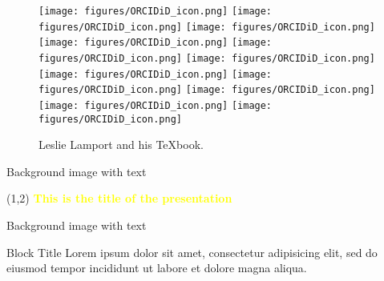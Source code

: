 \documentclass{beamer}
\begin{document}
\begin{frame}
\begin{figure}[!htpb]
\label{fig:leslie}
\texttt{[image: figures/ORCIDiD\_icon.png]}
\texttt{[image: figures/ORCIDiD\_icon.png]}
\texttt{[image: figures/ORCIDiD\_icon.png]}
\texttt{[image: figures/ORCIDiD\_icon.png]}
\texttt{[image: figures/ORCIDiD\_icon.png]}
\texttt{[image: figures/ORCIDiD\_icon.png]}
\texttt{[image: figures/ORCIDiD\_icon.png]}
\texttt{[image: figures/ORCIDiD\_icon.png]}
\texttt{[image: figures/ORCIDiD\_icon.png]}
\texttt{[image: figures/ORCIDiD\_icon.png]}
\texttt{[image: figures/ORCIDiD\_icon.png]}

\caption{Leslie Lamport and his TeXbook.}
\end{figure}
\end{frame}



{ 
\begin{frame}{Background image with text}
 \color{yellow}{ABCD}
 \begin{textblock}{10.0}(1,2)
  \textcolor{yellow}{\textbf{This is the title of the presentation}}
 \end{textblock}
 

\end{frame}}


{ 
\begin{frame}{Background image with text}
\vspace{2em}
\begin{block}{Block Title}
Lorem ipsum dolor sit amet, consectetur adipisicing elit, 
sed do eiusmod tempor incididunt ut labore et 
dolore magna aliqua.
\end{block}
\end{frame}}

\end{document}
